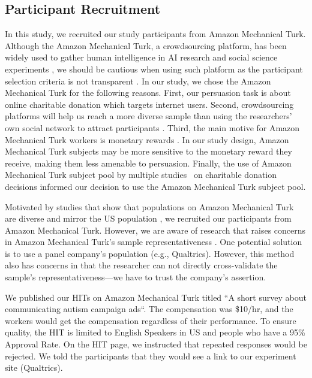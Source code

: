\subsection{Participant Recruitment}
\label{sub:Participant Recruitment}
In this study, we recruited our study participants from Amazon Mechanical Turk. Although the Amazon Mechanical Turk, a crowdsourcing platform, has been widely used to gather human intelligence in AI research and social science experiments \cite{ paolacci2014inside,berinsky2012evaluating,buhrmester2011amazon,branas2018gender,lee2013does,saunders2016no,arechar2017turking,sussman2015framing}, we should be cautious when using such platform as the participant selection criteria is not transparent \cite{landers2015inconvenient,paolacci2010running}. In our study, we chose the Amazon Mechanical Turk for the following reasons. First, our persuasion task is about online charitable donation which targets internet users. Second, crowdsourcing platforms will help us reach a more diverse sample than using the researchers' own social network to attract participants \cite{buhrmester2011amazon}. Third, the main motive for Amazon Mechanical Turk workers is monetary rewards \cite{berinsky2012evaluating}. In our study design, Amazon Mechanical Turk subjects may be more sensitive to the monetary reward they receive, making them less amenable to persuasion. Finally, the use of Amazon Mechanical Turk subject pool by multiple studies~\cite{branas2018gender,lee2013does,saunders2016no,arechar2017turking,sussman2015framing} on charitable donation decisions informed our decision to use the Amazon Mechanical Turk subject pool. 

Motivated by studies that show that populations on Amazon Mechanical Turk are diverse and mirror the US population \cite{buhrmester2011amazon,behrend2011viability,berinsky2012evaluating}, we recruited our participants from Amazon Mechanical Turk. However, we are aware of research that raises concerns in Amazon Mechanical Turk's sample representativeness \cite{landers2015inconvenient,paolacci2010running}. One potential solution is to use a panel company's population (e.g., Qualtrics). However, this method also has concerns in that the researcher can not directly cross-validate the sample's representativeness---we have to trust the company's assertion.

We published our HITs on Amazon Mechanical Turk titled ``A short survey about communicating autism campaign ads``. The compensation was \$10/hr, and the workers would get the compensation regardless of their performance. To ensure quality, the HIT is limited to English Speakers in US and people who have a 95\% Approval Rate. On the HIT page, we instructed that repeated responses would be rejected. We told the participants that they would see a link to our experiment site (Qualtrics). 
